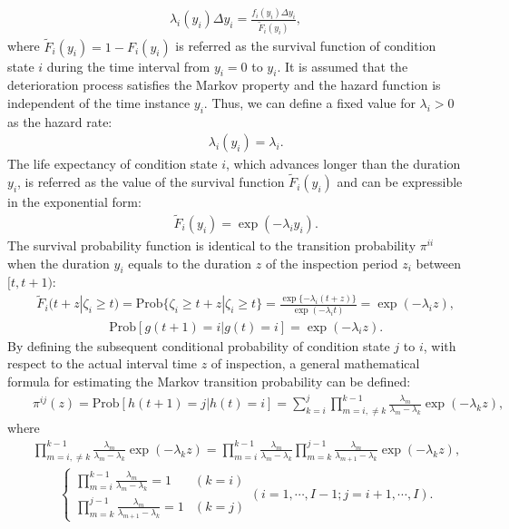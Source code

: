 \documentclass[a4paper,oneside,onecolumn,preprint,10pt,authoryear]{elsarticle}
\begin{document}
\begin{eqnarray}
\lambda_i(y_i)\Delta y_i = \frac{f_i(y_i) \Delta y_i}{\tilde{F}_i(y_i)},
\end{eqnarray}
where $\tilde{F}_i(y_i)=1-F_i(y_i)$  is referred as the survival function of condition state $i$ during the time interval from $y_i=0$ to $y_i$. It is assumed that the deterioration process satisfies the Markov property and the hazard function is independent of the time instance $y_i$. Thus, we can define a fixed value for $\lambda_i>0$ as the hazard rate:
\begin{eqnarray}
&& \lambda_i(y_i) = \lambda_i.
\end{eqnarray}
The life expectancy of condition state $i$, which advances longer than the duration $y_i$, is referred as the value of the survival function $\tilde{F}_i(y_i)$ and can be expressible in the exponential form:
\begin{eqnarray}
&& \tilde{F}_i(y_i)=\exp(-\lambda_i y_i). \label{prop}
\end{eqnarray}
The survival probability function is identical to the transition probability $\pi^{ii}$ when the duration $y_i$ equals to the duration $z$ of the inspection period $z_i$ between $[t,t+1)$:
\begin{eqnarray}
&& \tilde{F}_i(t+z | \zeta_i \ge t) =\mbox{Prob} \{ \zeta_i \ge t+z | \zeta_i \ge t \} = \frac{\exp \{-\lambda_i(t+z)\}}{\exp( - \lambda_i t)} =\exp (-\lambda_i z),
\end{eqnarray}
\begin{eqnarray}
&& \mbox{Prob}[g(t+1)=i|g(t)=i]=\exp(-\lambda_i z).\label{poi0}
\end{eqnarray}
By defining the subsequent conditional probability of condition state $j$ to $i$, with respect to the actual interval time $z$ of inspection, a general mathematical formula for estimating the Markov transition probability can be defined:
\begin{eqnarray}
&& \pi^{ij}(z)=\mbox{Prob}[h(t+1)=j|h(t)=i]  =\sum_{k=i}^{j}\prod_{m=i,\neq k}^{k-1}\frac{\lambda_m}{\lambda_{m}-\lambda_{k}} \exp (-\lambda_{k}z),
\end{eqnarray}
where
\begin{eqnarray}
&& \prod_{m=i,\neq k}^{k-1}\frac{\lambda_m}{\lambda_{m}-\lambda_{k}} \exp (-\lambda_{k}z) =\prod_{m=i}^{k-1}\frac{\lambda_m}{\lambda_{m}-\lambda_{k}}\prod_{m=k}^{j-1}\frac{\lambda_m}{\lambda_{m+1}-\lambda_{k}}\exp(-\lambda_{k} z),\nonumber
\end{eqnarray}
\begin{eqnarray}
&& \left\{
\begin{array}{ll}
\prod_{m=i}^{k-1}\frac{\lambda_m}{\lambda_{m}-\lambda_{k}}=1 & (k=i) \\
\prod_{m=k}^{j-1}\frac{\lambda_m}{\lambda_{m+1}-\lambda_{k}}=1 & (k=j) 
\end{array}
\right. (i=1,\cdots,I-1;j=i+1,\cdots,I). \label{poi} \nonumber
\end{eqnarray}
\end{document}
